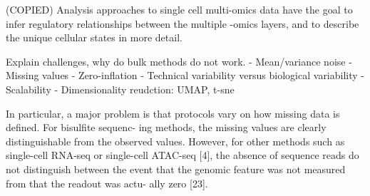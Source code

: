 

(COPIED) Analysis approaches to single cell multi-omics data have the goal to infer regulatory relationships between the multiple -omics layers, and to describe the unique cellular states in more detail.

Explain challenges, why do bulk methods do not work.
- Mean/variance noise
- Missing values
- Zero-inflation
- Technical variability versus biological variability
- Scalability
- Dimensionality reudction: UMAP, t-sne


In particular, a major problem is that protocols vary on how missing data is defined. For bisulfite sequenc- ing methods, the missing values are clearly distinguishable from the observed values. However, for other methods such as single-cell RNA-seq or single-cell ATAC-seq [4], the absence of sequence reads do not distinguish between the event that the genomic feature was not measured from that the readout was actu- ally zero [23].


